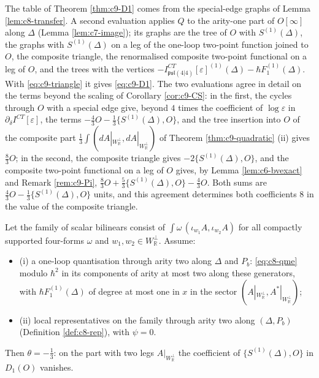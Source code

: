 \begin{remark}
\label{rem:c9-twoeval}
The table of Theorem \ref{thm:c9-D1} comes from the special-edge graphs of Lemma \ref{lem:c8-transfer}. A second evaluation applies $Q$ to the arity-one part of $O[\infty]$ along $\Delta$ (Lemma \ref{lem:c7-image}); its graphs are the tree of $O$ with $S^{(1)}(\Delta)$, the graphs with $S^{(1)}(\Delta)$ on a leg of the one-loop two-point function joined to $O$, the composite triangle, the renormalised composite two-point functional on a leg of $O$, and the trees with the vertices $-I^{CT}_{\mathfrak{psl}(4|4)}[\varepsilon]^{(1)}(\Delta)-\hbar F_1^{(1)}(\Delta)$. With \eqref{eq:c9-triangle} it gives \eqref{eq:c9-D1}. The two evaluations agree in detail on the terms beyond the scaling of Corollary \ref{cor:c9-CS}: in the first, the cycles through $O$ with a special edge give, beyond $4$ times the coefficient of $\log\varepsilon$ in $\partial_\delta I^{CT}[\varepsilon]$, the terms $-\tfrac43O-\tfrac13\{S^{(1)}(\Delta),O\}$, and the tree insertion into $O$ of the composite part $\tfrac13\int(dA|_{W_{\mathbb R}^\perp},dA|_{W_{\mathbb R}^\perp})$ of Theorem \ref{thm:c9-quadratic} (ii) gives $\tfrac83O$; in the second, the composite triangle gives $-2\{S^{(1)}(\Delta),O\}$, and the composite two-point functional on a leg of $O$ gives, by Lemma \ref{lem:c6-bvexact} and Remark \ref{rem:c9-Pi}, $\tfrac83O+\tfrac53\{S^{(1)}(\Delta),O\}-\tfrac43O$. Both sums are $\tfrac43O-\tfrac13\{S^{(1)}(\Delta),O\}$ units, and this agreement determines both coefficients $8$ in the value of the composite triangle.
\end{remark}

\begin{theorem}
\label{thm:c9-kappa}
Let the family of scalar bilinears consist of $\int\omega\,(\iota_{w_1}A,\iota_{w_2}A)$ for all compactly supported four-forms $\omega$ and $w_1,w_2\in W_{\mathbb R}^\perp$. Assume:
\begin{itemize}
\item (i) a one-loop quantisation through arity two along $\Delta$ and $P_b$: \eqref{eq:c8-qme} modulo $\hbar^2$ in its components of arity at most two along these generators, with $\hbar F_1^{(1)}(\Delta)$ of degree at most one in $x$ in the sector $(A|_{W_{\mathbb R}^\perp},A^*|_{W_{\mathbb R}^\perp})$;
\item (ii) local representatives on the family through arity two along $(\Delta,P_b)$ (Definition \ref{def:c8-rep}), with $\psi=0$.
\end{itemize}
Then $\theta=-\tfrac13$: on the part with two legs $A|_{W_{\mathbb R}^\perp}$ the coefficient of $\{S^{(1)}(\Delta),O\}$ in $D_1(O)$ vanishes.
\end{theorem}


